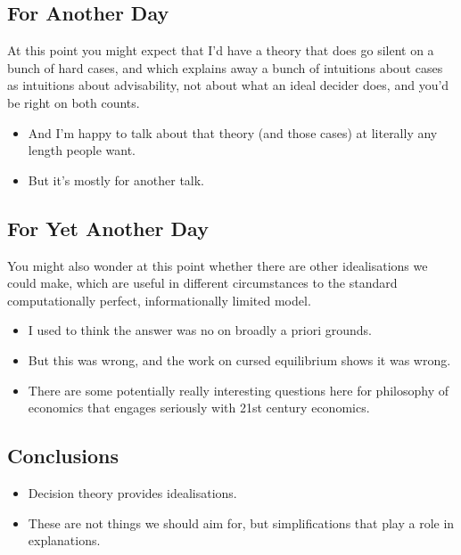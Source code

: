 \documentclass[
  letterpaper,
  DIV=11,
  numbers=noendperiod]{scrartcl}
\providecommand{\tightlist}{%
  \setlength{\itemsep}{0pt}\setlength{\parskip}{0pt}}\usepackage{longtable,booktabs,array}
\begin{document}
\subsection{For Another Day}\label{for-another-day}

At this point you might expect that I'd have a theory that does go
silent on a bunch of hard cases, and which explains away a bunch of
intuitions about cases as intuitions about advisability, not about what
an ideal decider does, and you'd be right on both counts.

\begin{itemize}
\tightlist
\item
  And I'm happy to talk about that theory (and those cases) at literally
  any length people want.
\item
  But it's mostly for another talk.
\end{itemize}

\subsection{For Yet Another Day}\label{for-yet-another-day}

You might also wonder at this point whether there are other
idealisations we could make, which are useful in different circumstances
to the standard computationally perfect, informationally limited model.

\begin{itemize}
\tightlist
\item
  I used to think the answer was no on broadly a priori grounds.
\item
  But this was wrong, and the work on cursed equilibrium shows it was
  wrong.
\item
  There are some potentially really interesting questions here for
  philosophy of economics that engages seriously with 21st century
  economics.
\end{itemize}

\subsection{Conclusions}\label{conclusions}

\begin{itemize}
\tightlist
\item
  Decision theory provides idealisations.
\item
  These are not things we should aim for, but simplifications that play
  a role in explanations.
\end{itemize}
\end{document}

